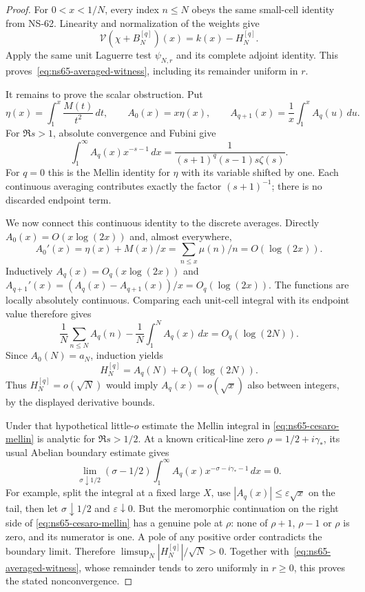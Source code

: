 \begin{proof}
For $0<x<1/N$, every index $n\leq N$ obeys the same small-cell
identity from NS-62. Linearity and normalization of the weights give
\[
 \mathcal V(\chi+B_N^{[q]})(x)=k(x)-H_N^{[q]}.
\]
Apply the same unit Laguerre test $\psi_{N,r}$ and its complete
adjoint identity. This proves~\eqref{eq:ns65-averaged-witness},
including its remainder uniform in $r$.

It remains to prove the scalar obstruction. Put
\[
 \eta(x)=\int_1^x\frac{M(t)}{t^2}\,dt,\qquad
 A_0(x)=x\eta(x),\qquad
 A_{q+1}(x)=\frac1x\int_1^x A_q(u)\,du.
\]
For $\Re s>1$, absolute convergence and Fubini give
\begin{equation}
 \int_1^\infty A_q(x)x^{-s-1}\,dx
   =\frac1{(s+1)^q(s-1)s\zeta(s)}.
 \label{eq:ns65-cesaro-mellin}
\end{equation}
For $q=0$ this is the Mellin identity for $\eta$ with its variable
shifted by one. Each continuous averaging contributes exactly the
factor $(s+1)^{-1}$; there is no discarded endpoint term.

We now connect this continuous identity to the discrete averages.
Directly $A_0(x)=O(x\log(2x))$ and, almost everywhere,
\[
 A_0'(x)=\eta(x)+M(x)/x
         =\sum_{n\leq x}\mu(n)/n=O(\log(2x)).
\]
Inductively $A_q(x)=O_q(x\log(2x))$ and
$A_{q+1}'(x)=(A_q(x)-A_{q+1}(x))/x=O_q(\log(2x))$.
The functions are locally absolutely continuous. Comparing each
unit-cell integral with its endpoint value therefore gives
\[
 \frac1N\sum_{n\leq N}A_q(n)-\frac1N\int_1^N A_q(x)\,dx
       =O_q(\log(2N)).
\]
Since $A_0(N)=a_N$, induction yields
\begin{equation}
 H_N^{[q]}=A_q(N)+O_q(\log(2N)).
 \label{eq:ns65-discrete-continuous}
\end{equation}
Thus $H_N^{[q]}=o(\sqrt N)$ would imply $A_q(x)=o(\sqrt x)$
also between integers, by the displayed derivative bounds.

Under that hypothetical little-$o$ estimate the Mellin integral in
\eqref{eq:ns65-cesaro-mellin} is analytic for $\Re s>1/2$.
At a known critical-line zero $\rho=1/2+i\gamma_*$, its usual
Abelian boundary estimate gives
\[
 \lim_{\sigma\downarrow1/2}(\sigma-1/2)
       \int_1^\infty A_q(x)x^{-\sigma-i\gamma_*-1}\,dx=0.
\]
For example, split the integral at a fixed large $X$, use
$|A_q(x)|\leq\varepsilon\sqrt x$ on the tail, then let
$\sigma\downarrow1/2$ and $\varepsilon\downarrow0$.
But the meromorphic continuation on the right side of
\eqref{eq:ns65-cesaro-mellin} has a genuine pole at $\rho$:
none of $\rho+1$, $\rho-1$ or $\rho$ is zero, and its numerator
is one. A pole of any positive order contradicts the boundary limit.
Therefore $\limsup_N|H_N^{[q]}|/\sqrt N>0$.
Together with~\eqref{eq:ns65-averaged-witness}, whose remainder tends
to zero uniformly in $r\geq0$, this proves the stated nonconvergence.
\end{proof}

